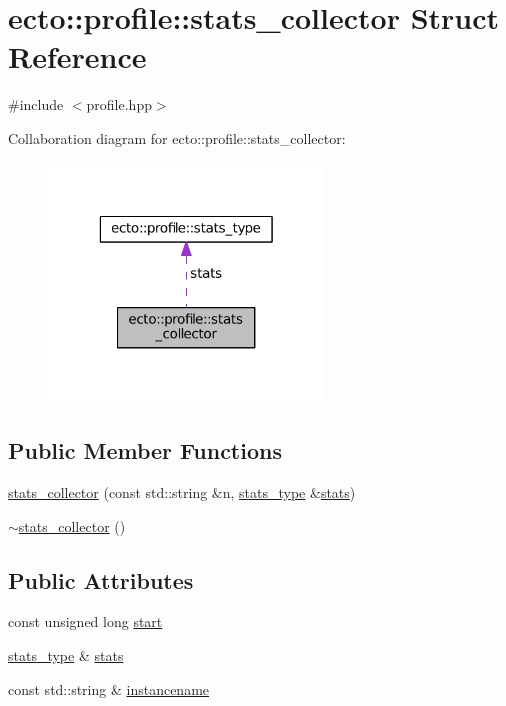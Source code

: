 \hypertarget{structecto_1_1profile_1_1stats__collector}{\section{ecto\-:\-:profile\-:\-:stats\-\_\-collector Struct Reference}
\label{structecto_1_1profile_1_1stats__collector}
}


{\ttfamily \#include $<$profile.\-hpp$>$}



Collaboration diagram for ecto\-:\-:profile\-:\-:stats\-\_\-collector\-:\nopagebreak
\begin{figure}[H]
\begin{center}
\leavevmode
\includegraphics[width=208pt]{structecto_1_1profile_1_1stats__collector__coll__graph}
\end{center}
\end{figure}
\subsection*{Public Member Functions}
\begin{DoxyCompactItemize}
\item 
\hyperlink{structecto_1_1profile_1_1stats__collector_adae561b196f7ec50f42ba76031924ee4}{stats\-\_\-collector} (const std\-::string \&n, \hyperlink{structecto_1_1profile_1_1stats__type}{stats\-\_\-type} \&\hyperlink{structecto_1_1profile_1_1stats__collector_a2c206fb60ea04b5162ec43a609f2a185}{stats})
\item 
\hyperlink{structecto_1_1profile_1_1stats__collector_aa1521de3406025190b06d0b7bad33064}{$\sim$stats\-\_\-collector} ()
\end{DoxyCompactItemize}
\subsection*{Public Attributes}
\begin{DoxyCompactItemize}
\item 
const unsigned long \hyperlink{structecto_1_1profile_1_1stats__collector_ae607313a8ecc75d6a6ab201cdf7c2d61}{start}
\item 
\hyperlink{structecto_1_1profile_1_1stats__type}{stats\-\_\-type} \& \hyperlink{structecto_1_1profile_1_1stats__collector_a2c206fb60ea04b5162ec43a609f2a185}{stats}
\item 
const std\-::string \& \hyperlink{structecto_1_1profile_1_1stats__collector_ac3d5d7adf91b02719a6b897869683f03}{instancename}
\end{DoxyCompactItemize}


